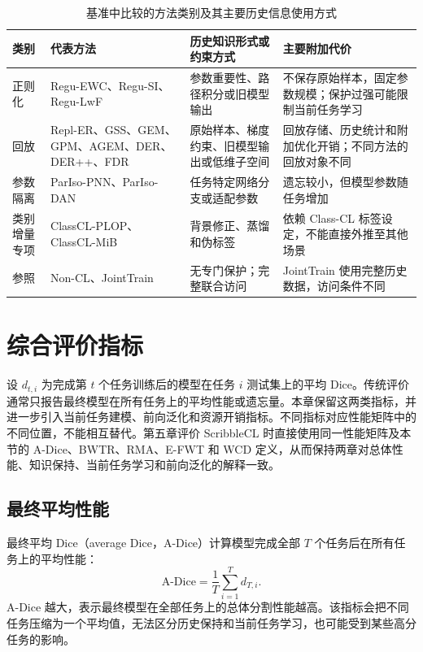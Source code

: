 \begin{table}[htbp]
\centering
\caption{基准中比较的方法类别及其主要历史信息使用方式}
\label{tab:benchmark-methods}
\thesistablefont
\setlength{\tabcolsep}{3pt}
\renewcommand{\arraystretch}{1.15}
\begin{tabular}{p{2.0cm}p{4.0cm}p{4.0cm}p{3.6cm}}
\toprule
类别 & 代表方法 & 历史知识形式或约束方式 & 主要附加代价 \\
\midrule
正则化 &
Regu-EWC、Regu-SI、Regu-LwF &
参数重要性、路径积分或旧模型输出 &
不保存原始样本，固定参数规模；保护过强可能限制当前任务学习 \\
\addlinespace
回放 &
Repl-ER、GSS、GEM、GPM、AGEM、DER、DER++、FDR &
原始样本、梯度约束、旧模型输出或低维子空间 &
回放存储、历史统计和附加优化开销；不同方法的回放对象不同 \\
\addlinespace
参数隔离 &
ParIso-PNN、ParIso-DAN &
任务特定网络分支或适配参数 &
遗忘较小，但模型参数随任务增加 \\
\addlinespace
类别增量专项 &
ClassCL-PLOP、ClassCL-MiB &
背景修正、蒸馏和伪标签 &
依赖 Class-CL 标签设定，不能直接外推至其他场景 \\
\addlinespace
参照 &
Non-CL、JointTrain &
无专门保护；完整联合访问 &
JointTrain 使用完整历史数据，访问条件不同 \\
\bottomrule
\end{tabular}

\end{table}


\section{综合评价指标}
\label{sec:benchmark-metrics}

设 $d_{t,i}$ 为完成第 $t$ 个任务训练后的模型在任务 $i$ 测试集上的平均 Dice。传统评价通常只报告最终模型在所有任务上的平均性能或遗忘量。本章保留这两类指标，并进一步引入当前任务建模、前向泛化和资源开销指标。不同指标对应性能矩阵中的不同位置，不能相互替代。第五章评价 ScribbleCL 时直接使用同一性能矩阵及本节的 A-Dice、BWTR、RMA、E-FWT 和 WCD 定义，从而保持两章对总体性能、知识保持、当前任务学习和前向泛化的解释一致。

\subsection*{最终平均性能}

最终平均 Dice（average Dice，A-Dice）计算模型完成全部 $T$ 个任务后在所有任务上的平均性能：
\begin{equation}
\mathrm{A\mbox{-}Dice}
=
\frac{1}{T}\sum_{i=1}^{T}d_{T,i}.
\label{eq:benchmark-adice}
\end{equation}
A-Dice 越大，表示最终模型在全部任务上的总体分割性能越高。该指标会把不同任务压缩为一个平均值，无法区分历史保持和当前任务学习，也可能受到某些高分任务的影响。

